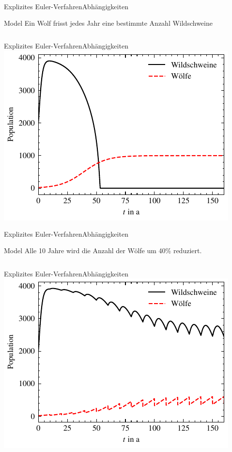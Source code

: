 \documentclass[xelatex,aspectratio=169]{beamer}
\begin{document}
\begin{frame}{Explizites Euler-Verfahren}{Abhängigkeiten}
    \begin{block}{Model}
        Ein Wolf frisst jedes Jahr eine bestimmte Anzahl Wildschweine
    \end{block}
    \inputminted[firstline=19, lastline=23]{python}{src/sim_dependency_b.py}
\end{frame}

\begin{frame}{Explizites Euler-Verfahren}{Abhängigkeiten}
    \centering
    \includegraphics[height=.8\textheight]{fig/sim_dependency_b.pdf}
\end{frame}

\begin{frame}{Explizites Euler-Verfahren}{Abhängigkeiten}
    \begin{block}{Model}
        Alle 10 Jahre wird die Anzahl der Wölfe um 40\% reduziert.
    \end{block}
    \inputminted[firstline=19, lastline=23]{python}{src/sim_dependency_c.py}
\end{frame}

\begin{frame}{Explizites Euler-Verfahren}{Abhängigkeiten}
    \centering
    \includegraphics[height=.8\textheight]{fig/sim_dependency_c.pdf}
\end{frame}
\end{document}
